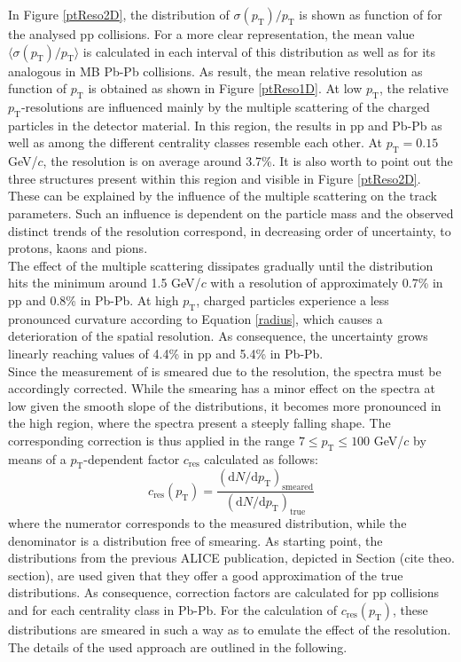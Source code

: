 \documentclass[12pt,a4paper]{report}
\begin{document}
\hspace{-0.3cm} In Figure \ref{ptReso2D}, the distribution of $\sigma(p_\text{T})/p_\text{T}$ is shown as function of \pt for the analysed pp collisions. For a more clear representation, the mean value $\langle\sigma(p_\text{T})/p_\text{T}\rangle$ is calculated in each \pt interval of this distribution as well as for its analogous in MB Pb-Pb collisions. As result, the mean relative \pt resolution as function of $p_\text{T}$ is obtained as shown in Figure \ref{ptReso1D}. At low $p_\text{T}$, the relative $p_\text{T}$-resolutions are influenced mainly by the multiple scattering of the charged particles in the detector material. In this region, the results in pp and Pb-Pb as well as among the different centrality classes resemble each other. At $p_\text{T} = 0.15$ GeV/$c$, the resolution is on average around 3.7\%. It is also worth to point out the three structures present within this \pt region and visible in Figure \ref{ptReso2D}. These can be explained by the influence of the multiple scattering on the track parameters. Such an influence is dependent on the particle mass and the observed distinct trends of the resolution correspond, in decreasing order of uncertainty, to protons, kaons and pions.\\
The effect of the multiple scattering dissipates gradually until the distribution hits the minimum around 1.5 GeV/$c$ with a \pt resolution of approximately 0.7\% in pp and 0.8\% in Pb-Pb. At high $p_\text{T}$, charged particles experience a less pronounced curvature according to Equation \ref{radius}, which causes a deterioration of the spatial resolution. As consequence, the uncertainty grows linearly reaching values of 4.4\% in pp and 5.4\% in Pb-Pb.\\
Since the measurement of \pt is smeared due to the resolution, the \pt spectra must be accordingly corrected. While the smearing has a minor effect on the \pt spectra at low \pt given the smooth slope of the distributions, it becomes more pronounced in the high \pt region, where the \pt spectra present a steeply falling shape. The corresponding correction is thus applied in the range $7 \leq p_\text{T} \leq 100$ GeV/$c$ by means of a $p_\text{T}$-dependent factor $c_\text{res}$ calculated as follows: 
\begin{equation}
c_\text{res}(p_\text{T}) = \dfrac{(\text{d}N/\text{d}p_\text{T})_\text{smeared}}{(\text{d}N/\text{d}p_\text{T})_\text{true}}
\end{equation}
where the numerator corresponds to the measured \pt distribution, while the denominator is a \pt distribution free of smearing. As starting point, the \pt distributions from the previous ALICE publication, depicted in Section (cite theo. section), are used  given that they offer a good approximation of the true \pt distributions. As consequence, correction factors are calculated for pp collisions and for each centrality class in Pb-Pb. For the calculation of $c_\text{res}(p_\text{T})$, these \pt distributions are smeared in such a way as to emulate the effect of the \pt resolution. The details of the used approach are outlined in the following.
\end{document}

